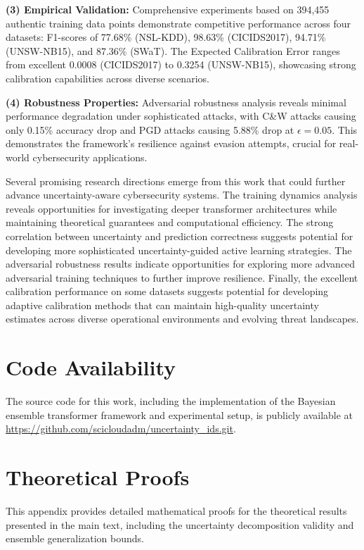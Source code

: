 \documentclass[journal]{IEEEtran}
\begin{document}
\textbf{(3) Empirical Validation:} Comprehensive experiments based on 394,455 authentic training data points demonstrate competitive performance across four datasets: F1-scores of 77.68\% (NSL-KDD), 98.63\% (CICIDS2017), 94.71\% (UNSW-NB15), and 87.36\% (SWaT). The Expected Calibration Error ranges from excellent 0.0008 (CICIDS2017) to 0.3254 (UNSW-NB15), showcasing strong calibration capabilities across diverse scenarios.

\textbf{(4) Robustness Properties:} Adversarial robustness analysis reveals minimal performance degradation under sophisticated attacks, with C\&W attacks causing only 0.15\% accuracy drop and PGD attacks causing 5.88\% drop at $\epsilon=0.05$. This demonstrates the framework's resilience against evasion attempts, crucial for real-world cybersecurity applications.

Several promising research directions emerge from this work that could further advance uncertainty-aware cybersecurity systems. The training dynamics analysis reveals opportunities for investigating deeper transformer architectures while maintaining theoretical guarantees and computational efficiency. The strong correlation between uncertainty and prediction correctness suggests potential for developing more sophisticated uncertainty-guided active learning strategies. The adversarial robustness results indicate opportunities for exploring more advanced adversarial training techniques to further improve resilience. Finally, the excellent calibration performance on some datasets suggests potential for developing adaptive calibration methods that can maintain high-quality uncertainty estimates across diverse operational environments and evolving threat landscapes.


\section*{Code Availability}
The source code for this work, including the implementation of the Bayesian ensemble transformer framework and experimental setup, is publicly available at \url{https://github.com/scicloudadm/uncertainty_ids.git}.

\appendix

\section{Theoretical Proofs}

This appendix provides detailed mathematical proofs for the theoretical results presented in the main text, including the uncertainty decomposition validity and ensemble generalization bounds.
\end{document}
